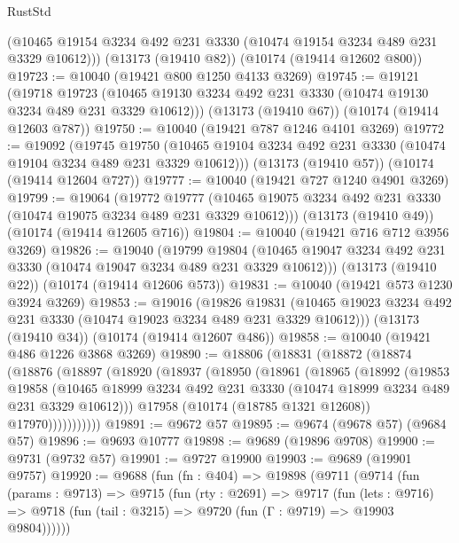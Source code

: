 \begin{lexlean}{RustStd}
\begin{coremodule}
      (@10465 @19154 @3234 @492 @231 @3330 (@10474 @19154 @3234 @489 @231 @3329 @10612)))
    (@13173 (@19410 @82))
    (@10174 (@19414 @12602 @800))
@19723 := @10040 (@19421 @800 @1250 @4133 @3269)
@19745 := @19121
    (@19718
      @19723
      (@10465 @19130 @3234 @492 @231 @3330 (@10474 @19130 @3234 @489 @231 @3329 @10612)))
    (@13173 (@19410 @67))
    (@10174 (@19414 @12603 @787))
@19750 := @10040 (@19421 @787 @1246 @4101 @3269)
@19772 := @19092
    (@19745
      @19750
      (@10465 @19104 @3234 @492 @231 @3330 (@10474 @19104 @3234 @489 @231 @3329 @10612)))
    (@13173 (@19410 @57))
    (@10174 (@19414 @12604 @727))
@19777 := @10040 (@19421 @727 @1240 @4901 @3269)
@19799 := @19064
    (@19772
      @19777
      (@10465 @19075 @3234 @492 @231 @3330 (@10474 @19075 @3234 @489 @231 @3329 @10612)))
    (@13173 (@19410 @49))
    (@10174 (@19414 @12605 @716))
@19804 := @10040 (@19421 @716 @712 @3956 @3269)
@19826 := @19040
    (@19799
      @19804
      (@10465 @19047 @3234 @492 @231 @3330 (@10474 @19047 @3234 @489 @231 @3329 @10612)))
    (@13173 (@19410 @22))
    (@10174 (@19414 @12606 @573))
@19831 := @10040 (@19421 @573 @1230 @3924 @3269)
@19853 := @19016
    (@19826
      @19831
      (@10465 @19023 @3234 @492 @231 @3330 (@10474 @19023 @3234 @489 @231 @3329 @10612)))
    (@13173 (@19410 @34))
    (@10174 (@19414 @12607 @486))
@19858 := @10040 (@19421 @486 @1226 @3868 @3269)
@19890 := @18806
    (@18831
      (@18872
        (@18874
          (@18876
            (@18897
              (@18920
                (@18937
                  (@18950
                    (@18961
                      (@18965
                        (@18992
                          (@19853
                            @19858
                            (@10465
                              @18999
                              @3234
                              @492
                              @231
                              @3330
                              (@10474 @18999 @3234 @489 @231 @3329 @10612)))
                          @17958
                          (@10174 (@18785 @1321 @12608))
                          @17970)))))))))))
@19891 := @9672 @57
@19895 := @9674 (@9678 @57) (@9684 @57)
@19896 := @9693 @10777
@19898 := @9689 (@19896 @9708)
@19900 := @9731 (@9732 @57)
@19901 := @9727 @19900
@19903 := @9689 (@19901 @9757)
@19920 := @9688
    (fun (fn : @404) =>
    @19898
      (@9711
        (@9714
          (fun (params : @9713) =>
          @9715
            (fun (rty : @2691) =>
            @9717
              (fun (lets : @9716) =>
              @9718 (fun (tail : @3215) => @9720 (fun (Γ : @9719) => @19903 @9804))))))

\end{coremodule}
\end{lexlean}
